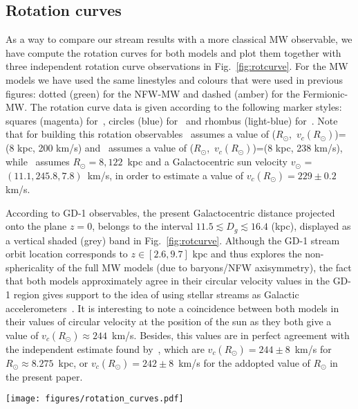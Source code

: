 \documentclass[twocolumn]{aa}
\begin{document}
\subsection{Rotation curves}
As a way to compare our stream results with a more classical MW observable, we have compute the rotation curves for both models and plot them together with three independent rotation curve observations in
Fig.~\ref{fig:rotcurve}.
For the MW models we have used the same linestyles and colours that were used in previous figures:
dotted (green) for the NFW-MW and dashed (amber) for the Fermionic-MW.
The rotation curve data is given according to the following marker styles: squares (magenta)
for~\citet{sofue_rotation_2013}, circles (blue) for~\citet{Eilers_2019} and rhombus (light-blue)
for~\citet{sofue_2020}. Note that for building this rotation observables~\citet{sofue_rotation_2013}
assumes a value of ($R_\odot$,~$v_c(R_\odot)$)=(8 kpc, 200 km/s) and~\citet{sofue_2020} assumes
a value of ($R_\odot$,~$v_c(R_\odot)$)=(8 kpc, 238 km/s), while~\citet{Eilers_2019}
assumes $R_\odot=8,122$~kpc and a Galactocentric sun velocity $v_\odot$ = $(11.1, 245.8, 7.8)$~km/s,
in order to estimate a value of $v_c(R_\odot)=229\pm0.2$ km/s.

According to GD-1 observables, the present Galactocentric distance projected onto the plane $z=0$,
belongs to the interval $11.5 \lesssim D_g \lesssim 16.4$ (kpc), displayed as a vertical shaded (grey) band in
Fig.~\ref{fig:rotcurve}.
Although the GD-1 stream orbit location corresponds to $z\in [2.6, 9.7]$ kpc and thus explores the non-sphericality of the full MW models (due to baryons/NFW axisymmetry), the fact that both models approximately agree in their circular velocity values in the GD-1 region gives support to the idea of using stellar streams as Galactic
accelerometers~\citep{Ibata_2016}.
It is interesting to note a coincidence between both models in their values of circular velocity
at the position of the sun as they both give a value of $v_c(R_\odot)\approx 244$~km/s.
Besides, this values are in perfect agreement with the independent estimate found
by~\citet{2020arXiv201202169B}, which are $v_c(R_\odot)=244\pm 8$~km/s for $R_\odot \approx 8.275$~kpc, or $v_c(R_\odot)=242\pm 8$~km/s for the addopted value of $R_\odot$ in the present paper.

\begin{figure*}
   \centering
   \texttt{[image: figures/rotation\_curves.pdf]}
   \caption{Rotation curve of MW models and observations: NFW-MW model in dotted (green), Fermionic-MW in dashed (amber),~\citet{sofue_rotation_2013} with squares (magenta),~\citet{Eilers_2019} with circles (blue) for~\citet{Eilers_2019} and~\citet{sofue_2020} with rhombus (light-blue). The region where the GD-1 stream is located at cero redshift is displayed with a vertical grey band.}
   \label{fig:rotcurve}
\end{figure*}
\end{document}
